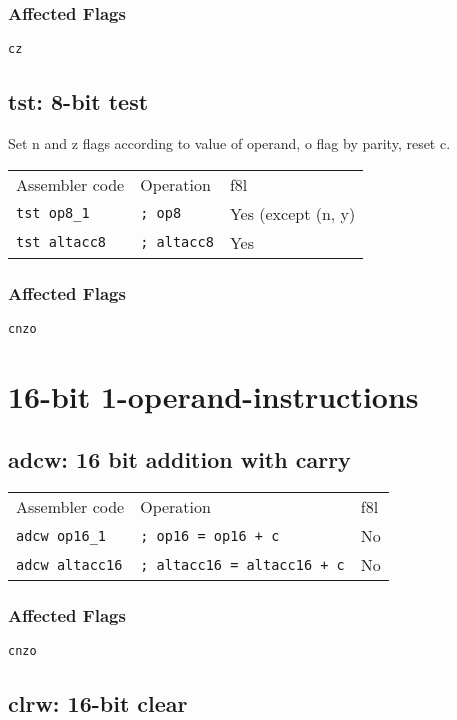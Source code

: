 \documentclass{book}
\begin{document}
\subsubsection*{Affected Flags}

\texttt{cz}


\subsection{tst: 8-bit test}

Set n and z flags according to value of operand, o flag by parity, reset c.

\begin{tabular}{l l l}
Assembler code       & Operation          & f8l \\
\texttt{tst op8\_1}  & \texttt{; op8}     & Yes (except (n, y) \\
\texttt{tst altacc8} & \texttt{; altacc8} & Yes
\end{tabular}

\subsubsection*{Affected Flags}

\texttt{cnzo}


\section{16-bit 1-operand-instructions}

\subsection{adcw: 16 bit addition with carry}

\begin{tabular}{l l l}
Assembler code         & Operation                          & f8l \\
\texttt{adcw op16\_1}  & \texttt{; op16 = op16 + c}         & No \\
\texttt{adcw altacc16} & \texttt{; altacc16 = altacc16 + c} & No
\end{tabular}

\subsubsection*{Affected Flags}

\texttt{cnzo}


\subsection{clrw: 16-bit clear}
\end{document}
